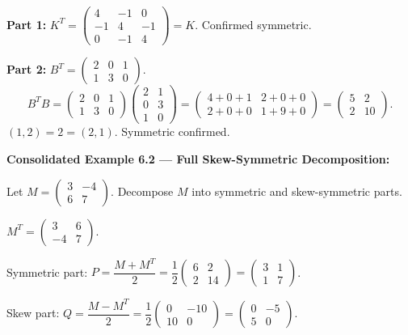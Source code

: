 \documentclass[12pt,a4paper]{article}
\begin{document}
\textbf{Part 1:} $K^T = \begin{pmatrix}4&-1&0\\-1&4&-1\\0&-1&4\end{pmatrix} = K$. Confirmed symmetric.

\textbf{Part 2:} $B^T = \begin{pmatrix}2&0&1\\1&3&0\end{pmatrix}$.
\[
B^T B = \begin{pmatrix}2&0&1\\1&3&0\end{pmatrix}\begin{pmatrix}2&1\\0&3\\1&0\end{pmatrix} = \begin{pmatrix}4+0+1&2+0+0\\2+0+0&1+9+0\end{pmatrix} = \begin{pmatrix}5&2\\2&10\end{pmatrix}.
\]
$(1,2) = 2 = (2,1)$. Symmetric confirmed. \checkmark

\textbf{Consolidated Example 6.2 --- Full Skew-Symmetric Decomposition:}

Let $M = \begin{pmatrix}3&-4\\6&7\end{pmatrix}$. Decompose $M$ into symmetric and skew-symmetric parts.

$M^T = \begin{pmatrix}3&6\\-4&7\end{pmatrix}$.

Symmetric part: $P = \dfrac{M + M^T}{2} = \dfrac{1}{2}\begin{pmatrix}6&2\\2&14\end{pmatrix} = \begin{pmatrix}3&1\\1&7\end{pmatrix}$.

Skew part: $Q = \dfrac{M - M^T}{2} = \dfrac{1}{2}\begin{pmatrix}0&-10\\10&0\end{pmatrix} = \begin{pmatrix}0&-5\\5&0\end{pmatrix}$.
\end{document}
